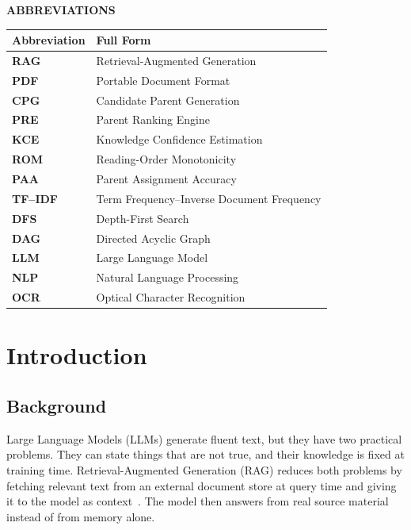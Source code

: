 \documentclass[12pt,a4paper]{report}
\begin{document}
\tableofcontents\clearpage

{}
\listoffigures\clearpage

{}
\listoftables\clearpage

{}
\begin{center}{\Large\bfseries ABBREVIATIONS}\end{center}
\vspace{6mm}
\noindent
\begin{tabularx}{\textwidth}{@{} >{\bfseries}p{3.0cm} X @{}}
\toprule
\textbf{Abbreviation} & \textbf{Full Form} \\ \midrule
RAG   & Retrieval-Augmented Generation \\
PDF   & Portable Document Format \\
CPG   & Candidate Parent Generation \\
PRE   & Parent Ranking Engine \\
KCE   & Knowledge Confidence Estimation \\
ROM   & Reading-Order Monotonicity \\
PAA   & Parent Assignment Accuracy \\
TF--IDF & Term Frequency--Inverse Document Frequency \\
DFS   & Depth-First Search \\
DAG   & Directed Acyclic Graph \\
LLM   & Large Language Model \\
NLP   & Natural Language Processing \\
OCR   & Optical Character Recognition \\ \bottomrule
\end{tabularx}
\clearpage

\setcounter{page}{1}
\chapter{Introduction}

\section{Background}
Large Language Models (LLMs) generate fluent text, but they have two practical
problems. They can state things that are not true, and their knowledge is fixed at
training time. Retrieval-Augmented Generation (RAG) reduces both problems by fetching
relevant text from an external document store at query time and giving it to the model
as context~\cite{lewis2020rag,guu2020realm}. The model then answers from real source
material instead of from memory alone.
\end{document}
